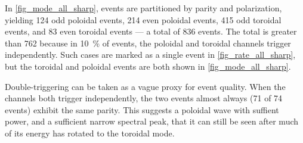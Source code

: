 











In \cref{fig_mode_all_sharp}, events are partitioned by parity and polarization, yielding 124 odd poloidal events, 214 even poloidal events, 415 odd toroidal events, and 83 even toroidal events --- a total of 836 events. The total is greater than 762 because in \about\SI{10}{\percent} of events, the poloidal and toroidal channels trigger independently. Such cases are marked as a single event in \cref{fig_rate_all_sharp}, but the toroidal and poloidal events are both shown in \cref{fig_mode_all_sharp}. 














Double-triggering can be taken as a vague proxy for event quality. When the channels both trigger independently, the two events almost always (71 of 74 events) exhibit the same parity. This suggests a poloidal wave with suffient power, and a sufficient narrow spectral peak, that it can still be seen after much of its energy has rotated to the toroidal mode. 

